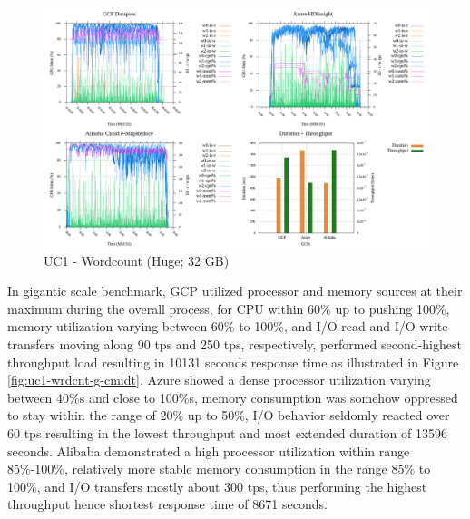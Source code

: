 \documentclass[review]{elsarticle}
\begin{document}
	\begin{figure}[p]
		\caption{UC1 - Wordcount (Huge; 32 GB)}
		\label{fig:uc1-wrdcnt-h-cmidt}
		\includegraphics[width=\textwidth]{uc1-wrdcnt-h-cmidt}
		\centering
	\end{figure}
	
	In gigantic scale benchmark, GCP utilized processor and memory sources at their maximum during the overall process, for CPU within 60\% up to pushing 100\%, memory utilization varying between 60\% to 100\%, and I/O-read and I/O-write transfers moving along 90 tps and 250 tps, respectively, performed second-highest throughput load resulting in 10131 seconds response time as illustrated in Figure \ref{fig:uc1-wrdcnt-g-cmidt}. Azure showed a dense processor utilization varying between 40\%s and close to 100\%s, memory consumption was somehow oppressed to stay within the range of 20\% up to 50\%, I/O behavior seldomly reacted over 60 tps resulting in the lowest throughput and most extended duration of 13596 seconds. Alibaba demonstrated a high processor utilization within range 85\%-100\%, relatively more stable memory consumption in the range 85\% to 100\%, and I/O transfers mostly about 300 tps, thus performing the highest throughput hence shortest response time of 8671 seconds.
	
\end{document}
